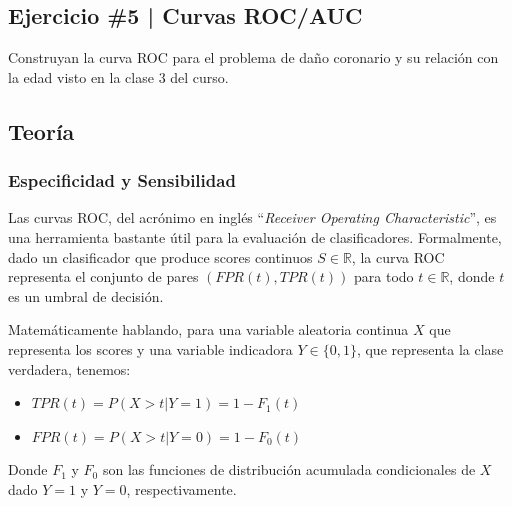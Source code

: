 \newpage

\begin{myblock}
\section*{Ejercicio \#5 | Curvas ROC/AUC}

Construyan la curva ROC para el problema de daño coronario y su relación con la edad visto en la
clase 3 del curso. 

\end{myblock}


\subsection{Teoría}

    \subsubsection{Especificidad y Sensibilidad}

        Las curvas ROC, del acrónimo en inglés ``\textit{Receiver Operating Characteristic}'', es una herramienta
        bastante útil para la evaluación de clasificadores. Formalmente, dado un clasificador que produce scores
        continuos $S \in \mathbb{R}$, la curva ROC representa el conjunto de pares $(FPR(t), TPR(t))$ para
        todo $t \in \mathbb{R}$, donde $t$ es un umbral de decisión.

        Matemáticamente hablando, para una variable aleatoria continua $X$ que representa los scores y una variable
        indicadora $Y \in \{0,1\}$, que representa la clase verdadera, tenemos:

        \begin{itemize}
            \item $TPR(t) = P(X > t | Y = 1) = 1 - F_1(t)$
            \item $FPR(t) = P(X > t | Y = 0) = 1 - F_0(t)$
        \end{itemize}

        Donde $F_1$ y $F_0$ son las funciones de distribución acumulada condicionales de $X$ dado $Y = 1$ y
        $Y = 0$, respectivamente.  

